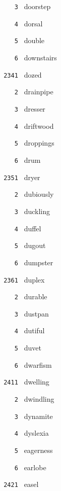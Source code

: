 \documentclass[11pt]{article}
\begin{document}
\begin{multicols}{6}
\noindent \texttt{ \ \ \ 3 } doorstep  \par
\noindent \texttt{ \ \ \ 4 } dorsal  \par
\noindent \texttt{ \ \ \ 5 } double  \par
\noindent \texttt{ \ \ \ 6 } downstairs  \par
\vspace{3mm}
\noindent \texttt{ 2341 } dozed  \par
\noindent \texttt{ \ \ \ 2 } drainpipe  \par
\noindent \texttt{ \ \ \ 3 } dresser  \par
\noindent \texttt{ \ \ \ 4 } driftwood  \par
\noindent \texttt{ \ \ \ 5 } droppings  \par
\noindent \texttt{ \ \ \ 6 } drum  \par
\vspace{3mm}
\noindent \texttt{ 2351 } dryer  \par
\noindent \texttt{ \ \ \ 2 } dubiously  \par
\noindent \texttt{ \ \ \ 3 } duckling  \par
\noindent \texttt{ \ \ \ 4 } duffel  \par
\noindent \texttt{ \ \ \ 5 } dugout  \par
\noindent \texttt{ \ \ \ 6 } dumpster  \par
\vspace{3mm}
\noindent \texttt{ 2361 } duplex  \par
\noindent \texttt{ \ \ \ 2 } durable  \par
\noindent \texttt{ \ \ \ 3 } dustpan  \par
\noindent \texttt{ \ \ \ 4 } dutiful  \par
\noindent \texttt{ \ \ \ 5 } duvet  \par
\noindent \texttt{ \ \ \ 6 } dwarfism  \par
\noindent \texttt{ 2411 } dwelling  \par
\noindent \texttt{ \ \ \ 2 } dwindling  \par
\noindent \texttt{ \ \ \ 3 } dynamite  \par
\noindent \texttt{ \ \ \ 4 } dyslexia  \par
\noindent \texttt{ \ \ \ 5 } eagerness  \par
\noindent \texttt{ \ \ \ 6 } earlobe  \par
\vspace{3mm}
\noindent \texttt{ 2421 } easel  \par

\end{multicols}
\end{document}
